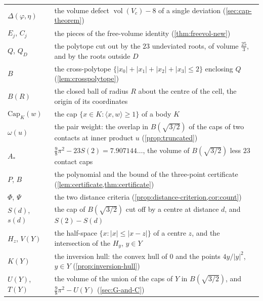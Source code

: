 \documentclass[11pt,reqno]{amsart}
\renewcommand{\_}{\origunderscore\allowbreak}
\numberwithin{equation}{section}
\theoremstyle{plain}
\theoremstyle{definition}
\theoremstyle{remark}
\newcommand{\tilt}{\varphi}                  %
\newcommand{\dev}{\eta}                      %
\newcommand{\defect}{\Delta}                 %
\newcommand{\capQ}{\mathrm{Cap}}             %
\DeclareMathOperator{\vol}{vol}
\begin{document}
\begin{longtable}{@{}l@{\hspace{1.8em}}l@{}}
$\defect(\tilt,\dev)$ & \parbox[t]{0.76\textwidth}{\raggedright the volume defect $\vol(V_c)-8$ of a single deviation (\cref{sec:cap-theorem})}\\
$E_j$, $C_j$ & \parbox[t]{0.76\textwidth}{\raggedright the pieces of the free-volume identity (\cref{thm:freevol-new})}\\
$Q$, $Q_D$ & \parbox[t]{0.76\textwidth}{\raggedright the polytope cut out by the $23$ undeviated roots, of volume $\frac{25}3$, and by the roots outside $D$}\\
$B$ & \parbox[t]{0.76\textwidth}{\raggedright the cross-polytope $\{|x_0|+|x_1|+|x_2|+|x_3|\le2\}$ enclosing $Q$ (\cref{lem:crosspolytope})}\\
$B(R)$ & \parbox[t]{0.76\textwidth}{\raggedright the closed ball of radius $R$ about the centre of the cell, the origin of its coordinates}\\
$\capQ_K(w)$ & \parbox[t]{0.76\textwidth}{\raggedright the cap $\{x\in K:\langle x,w\rangle\ge1\}$ of a body $K$}\\
$\omega(u)$ & \parbox[t]{0.76\textwidth}{\raggedright the pair weight: the overlap in $B(\sqrt{3/2})$ of the caps of two contacts at inner product $u$ (\cref{prop:truncated})}\\
$A_*$ & \parbox[t]{0.76\textwidth}{\raggedright $\frac98\pi^2-23S(2)=7.907144\ldots$, the volume of $B(\sqrt{3/2})$ less $23$ contact caps}\\
$P$, $B$ & \parbox[t]{0.76\textwidth}{\raggedright the polynomial and the bound of the three-point certificate (\cref{lem:certificate,thm:certificate})}\\
$\Phi$, $\Psi$ & \parbox[t]{0.76\textwidth}{\raggedright the two distance criteria (\cref{prop:distance-criterion,cor:count})}\\
$S(d)$, $s(d)$ & \parbox[t]{0.76\textwidth}{\raggedright the cap of $B(\sqrt{3/2})$ cut off by a centre at distance $d$, and $S(2)-S(d)$}\\
$H_z$, $V(Y)$ & \parbox[t]{0.76\textwidth}{\raggedright the half-space $\{x:|x|\le|x-z|\}$ of a centre $z$, and the intersection of the $H_y$, $y\in Y$}\\
$K(Y)$ & \parbox[t]{0.76\textwidth}{\raggedright the inversion hull: the convex hull of $0$ and the points $4y/|y|^2$, $y\in Y$ (\cref{prop:inversion-hull})}\\
$U(Y)$, $T(Y)$ & \parbox[t]{0.76\textwidth}{\raggedright the volume of the union of the caps of $Y$ in $B(\sqrt{3/2})$, and $\frac98\pi^2-U(Y)$ (\cref{sec:G-and-C})}\\

\end{longtable}
\end{document}
